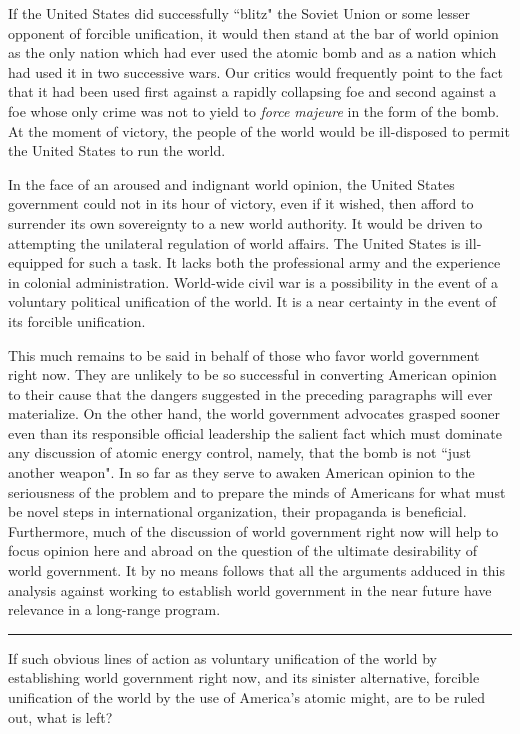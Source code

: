 If the United States did successfully ``blitz" the Soviet Union or some lesser opponent of forcible unification, it would then stand at the bar of world opinion as the only nation which had ever used the atomic bomb and as a nation which had used it in two successive wars. Our critics would frequently point to the fact that it had been used first against a rapidly collapsing foe and second against a foe whose only crime was not to yield to \emph{force majeure} in the form of the bomb. At the moment of victory, the people of the world would be ill-disposed to permit the United States to run the world.

In the face of an aroused and indignant world opinion, the United States government could not in its hour of victory, even if it wished, then afford to surrender its own sovereignty to a new world authority. It would be driven to attempting the unilateral regulation of world affairs. The United States is ill-equipped for such a task. It lacks both the professional army and the experience in colonial administration. World-wide civil war is a possibility in the event of a voluntary political unification of the world. It is a near certainty in the event of its forcible unification.

This much remains to be said in behalf of those who favor world government right now. They are unlikely to be so successful in converting American opinion to their cause that the dangers suggested in the preceding paragraphs will ever materialize. On the other hand, the world government advocates grasped sooner even than its responsible official leadership the salient fact which must dominate any discussion of atomic energy control, namely, that the bomb is not ``just another weapon". In so far as they serve to awaken American opinion to the seriousness of the problem and to prepare the minds of Americans for what must be novel steps in international organization, their propaganda is beneficial. Furthermore, much of the discussion of world government right now will help to focus opinion here and abroad on the question of the ultimate desirability of world government. It by no means follows that all the arguments adduced in this analysis against working to establish world government in the near future have relevance in a long-range program.

\noindent\hfil\rule{0.4\textwidth}{.4pt}\hfil

\vspace{4pt}

If such obvious lines of action as voluntary unification of the world by establishing world government right now, and its sinister alternative, forcible unification of the world by the use of America's atomic might, are to be ruled out, what is left?


